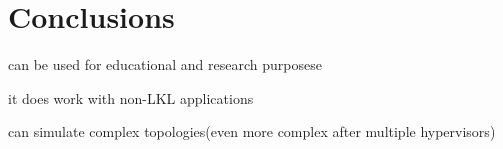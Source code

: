 \chapter{Conclusions}
\label{chapter:conclusions}
\project can be used for educational and research purposese

it does work with non-LKL applications

can simulate complex topologies(even more complex after multiple hypervisors)
